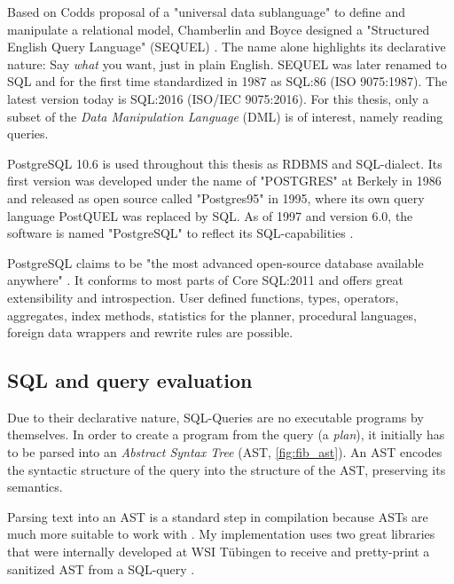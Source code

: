 Based on Codds proposal of a "universal data sublanguage" to define and manipulate a relational model, Chamberlin and Boyce designed a "Structured English Query Language" (SEQUEL) \cite{sequel, sequel2}. The name alone highlights its declarative nature: Say \textit{what} you want, just in plain English. SEQUEL was later renamed to SQL and for the first time standardized in 1987 as SQL:86 (ISO 9075:1987). The latest version today is SQL:2016 (ISO/IEC 9075:2016). For this thesis, only a subset of the \textit{Data Manipulation Language} (DML) is of interest, namely reading queries.

PostgreSQL 10.6 is used throughout this thesis as RDBMS and SQL-dialect. Its first version was developed under the name of "POSTGRES" at Berkely in 1986 \cite[xxxvi ff.]{psql} and released as open source called "Postgres95" in 1995, where its own query language PostQUEL was replaced by SQL. As of 1997 and version 6.0, the software is named "PostgreSQL" to reflect its SQL-capabilities \cite[xxxvi ff.]{psql}.

PostgreSQL claims to be "the most advanced open-source database available anywhere" \cite[xxxvii]{psql}. It conforms to most parts of Core SQL:2011 \cite[S. 2198]{psql} and offers great extensibility and introspection. User defined functions, types, operators, aggregates, index methods, statistics for the planner, procedural languages, foreign data wrappers and rewrite rules are possible.

\subsection{SQL and query evaluation}

Due to their declarative nature, SQL-Queries are no executable programs by themselves. In order to create a program from the query (a \textit{plan}), it initially has to be parsed into an \textit{Abstract Syntax Tree} (AST, \autoref{fig:fib_ast}). An AST encodes the syntactic structure of the query into the structure of the AST, preserving its semantics.

Parsing text into an AST is a standard step in compilation because ASTs are much more suitable to work with \cite[p. 5]{dragenbook}. My implementation uses two great libraries that were internally developed at WSI Tübingen to receive and pretty-print a sanitized AST from a SQL-query \cite{denis_hirn, peter_richter}.

